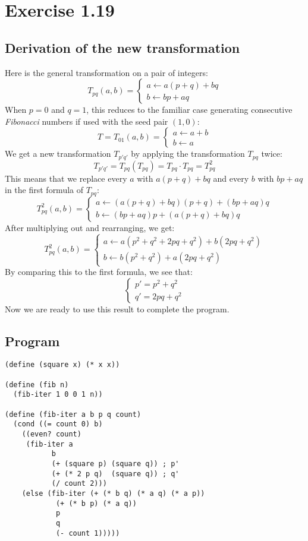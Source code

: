 \documentclass{article}
\begin{document}
\section*{Exercise 1.19}

\subsection*{Derivation of the new transformation}

Here is the general transformation on a pair of integers:
$$  T_{pq}(a, b) = 
\begin{cases} 
    a \gets a(p + q) + bq \\
    b \gets bp + aq
\end{cases} $$
When $p = 0$ and $q = 1$, this reduces to the familiar case generating 
consecutive \emph{Fibonacci} numbers if used with the seed pair $(1, 0)$:
$$ T = T_{01}(a, b) = 
\begin{cases} 
    a \gets a + b \\
    b \gets a
\end{cases} $$
We get a new transformation $T_{p'q'}$ by applying the transformation $T_{pq}$ 
twice:
$$ T_{p'q'} = T_{pq}(T_{pq}) = T_{pq} \cdot T_{pq} = T_{pq}^2 $$
This means that we replace every $a$ with $a(p + q) + bq$ and every $b$ 
with $bp + aq$ in the first formula of $T_{pq}$: 
$$  T_{pq}^2(a, b) = 
\begin{cases} 
    a \gets (a(p + q) + bq)(p + q) + (bp + aq)q \\
    b \gets (bp + aq)p + (a(p + q) + bq)q
\end{cases} $$
After multiplying out and rearranging, we get:
$$  T_{pq}^2(a, b) = 
\begin{cases} 
    a \gets a(p^2 + q^2 + 2pq + q^2) + b(2pq + q^2) \\
    b \gets b(p^2 + q^2) + a(2pq + q^2)
\end{cases} $$
By comparing this to the first formula, we see that:
$$ \begin{cases} 
  p' = p^2 + q^2 \\
  q' = 2pq + q^2
\end{cases} $$
Now we are ready to use this result to complete the program.

\newpage
\subsection*{Program}

\begin{Verbatim}
(define (square x) (* x x))

(define (fib n)
  (fib-iter 1 0 0 1 n))

(define (fib-iter a b p q count)
  (cond ((= count 0) b)
	((even? count)
	 (fib-iter a
		   b
		   (+ (square p) (square q)) ; p'
		   (+ (* 2 p q)  (square q)) ; q'
		   (/ count 2)))
	(else (fib-iter (+ (* b q) (* a q) (* a p))
			(+ (* b p) (* a q))
			p
			q
			(- count 1)))))
\end{Verbatim}
\end{document}
